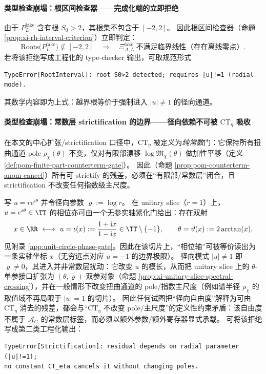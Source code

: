 \paragraph{类型检查崩塌：根区间检查器——完成化端的立即拒绝}
由于 \(P^{\mathrm{fake}}_L\) 含有根 \(S_0>2\)，其根集不包含于 \([-2,2]\)。
因此根区间检查器（命题 \ref{prop:xi-rh-interval-criterion}）立即判定：
\[
\mathrm{Roots}\bigl(P^{\mathrm{fake}}_L\bigr)\not\subseteq [-2,2]
\quad\Longrightarrow\quad
\Xi^{\mathrm{fake}}_{\Delta,L}\ \text{不满足临界线性（存在离线零点）}.
\]
若将该拒绝写成工程化的 type-checker 输出，可取规范形式
\begin{verbatim}
TypeError[RootInterval]: root S0>2 detected; requires |u|!=1 (radial mode).
\end{verbatim}
其数学内容即为上式：越界根等价于强制进入 \(|u|\neq 1\) 的径向通道。

\paragraph{类型检查崩塌：常数层 strictification 的边界——径向依赖不可被 \texorpdfstring{$\mathrm{CT}_\eta$}{CT} 吸收}
在本文的中心扩张/strictification 口径中，\(\mathrm{CT}_\eta\) 被定义为\emph{纯常数}门：它保持所有扭曲通道 pole \(\rho_\chi(\theta)\) 不变，仅对有限部漂移 \(\log\mathfrak{M}_\chi(\theta)\) 做加性平移（定义 \ref{def:pom-finite-part-counterterm-gate}）。
因此（命题 \ref{prop:pom-counterterm-anom-cancel}）所有可 strictify 的残差，必须在“有限部/常数层”闭合，且 strictification 不改变任何指数级主尺度。
\par
写 \(u=re^{i\theta}\) 并令径向参数 \(\varrho:=\log r\)。
在 unitary slice（\(r=1\)）上，\(u=e^{i\theta}\in\TT\) 的相位亦可由一个无参实轴紧化门给出：存在双射
\[
x\in\RR\ \longleftrightarrow\ u=\iota(x):=\frac{1+\mathrm{i}x}{1-\mathrm{i}x}\in\TT\setminus\{-1\},
\qquad
\theta=\vartheta(x):=2\arctan(x),
\]
见附录 \ref{app:unit-circle-phase-gate}。因此在该切片上，“相位轴”可被等价读出为一条实轴坐标 \(x\)（无穷远点对应 \(u=-1\) 的边界极限）。
径向模式 \(|u|\neq 1\) 即 \(\varrho\neq 0\)，其进入并非常数层扰动：它改变 \(u\) 的模长，从而把 unitary slice 上的 \(\theta\)-单参接口扩张为 \((\theta,\varrho)\)-双参对象（命题 \ref{prop:xi-unitary-slice-spectral-crossing}），并在一般情形下改变扭曲通道的 pole/指数主尺度（例如谱半径 \(\rho_\chi\) 的取值域不再局限于 \(|u|=1\) 的切片）。
因此任何试图把“径向自由度”解释为可由 \(\mathrm{CT}_\eta\) 消去的残差，都会与“\(\mathrm{CT}_\eta\) 不改变 pole/主尺度”的定义性约束矛盾：该自由度不属于 \(\mathcal{A}_G\) 的常数层标签，而必须以额外参数/额外寄存器显式承载。
可将该拒绝写成第二类工程化输出：
\begin{verbatim}
TypeError[Strictification]: residual depends on radial parameter (|u|!=1);
no constant CT_eta cancels it without changing poles.
\end{verbatim}

